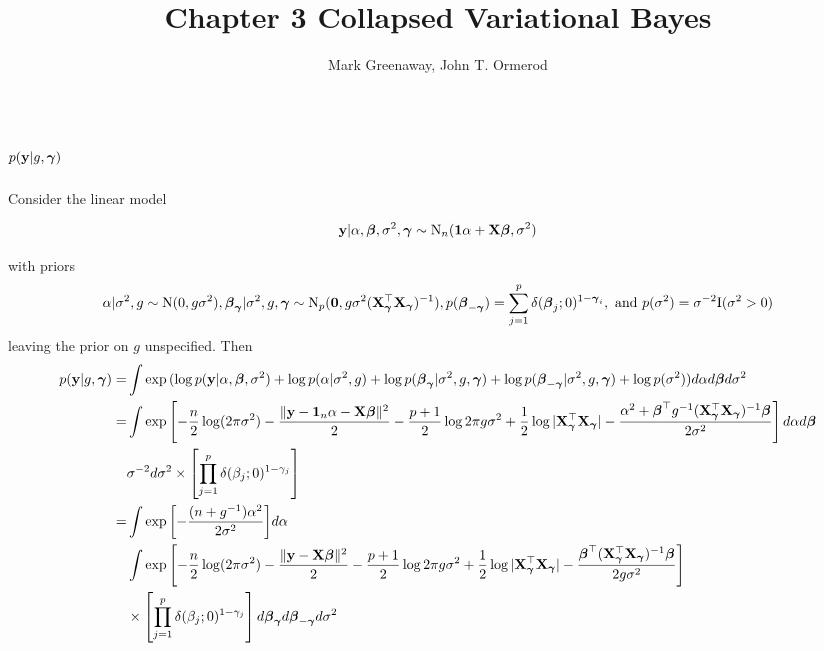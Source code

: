 \documentclass{amsart}[12pt]
\title{Chapter 3 Collapsed Variational Bayes}
\author{Mark Greenaway, John T. Ormerod}
\theoremstyle{definition}
\begin{document}
\section{$p({\bf y} | g, {\boldsymbol \gamma})$}
Consider the linear model

\[
	{\bf y} | \alpha, {\boldsymbol \beta}, \sigma^2, {\boldsymbol \gamma} \sim \text{N}_n({\bf 1} \alpha + {\bf X} {\boldsymbol \beta}, \sigma^2)
\]

\noindent with priors
\[
	\alpha | \sigma^2, g \sim \text{N}(0, g \sigma^2),
	{\boldsymbol \beta}_{\boldsymbol \gamma} | \sigma^2, g, {\boldsymbol \gamma} \sim \text{N}_p({\bf 0}, g \sigma^2 ({\bf X}_{\boldsymbol \gamma}^\top {\bf X}_{\boldsymbol \gamma})^{-1}),
	p({\boldsymbol \beta}_{-{\boldsymbol \gamma}}) = \sum_{j=1}^p \delta({\boldsymbol \beta}_j; 0)^{1 - {\boldsymbol \gamma}_i}, \text{ and }
	p(\sigma^2) = \sigma^{-2} \text{I}(\sigma^2 > 0)
\]
leaving the prior on $g$ unspecified. Then
\begin{align*}
	p({\bf y} | g, {\boldsymbol \gamma}) =& \int \exp{(\log p({\bf y}| \alpha, {\boldsymbol\beta}, \sigma^2) + \log p(\alpha | \sigma^2, g)
														+ \log p({\boldsymbol\beta}_{\boldsymbol\gamma}| \sigma^2, g, {\boldsymbol\gamma}) + \log p({\boldsymbol\beta}_{-{\boldsymbol\gamma}} | \sigma^2, g, {\boldsymbol\gamma}) + \log p(\sigma^2))} d \alpha d {\boldsymbol \beta} d \sigma^2 \\
		=& \int \exp{\left[-\frac{n}{2} \log (2 \pi \sigma^2) - \frac{\|{\bf y}- {\bf1}_n \alpha - {\bf X}{\boldsymbol\beta}\|^2}{2} 
		-\frac{p + 1}{2} \log{2\pi g \sigma^2} + \frac{1}{2} \log{|{\bf X}_{\boldsymbol\gamma}^\top {\bf X}_{\boldsymbol\gamma}|} - \frac{\alpha^2 + {\boldsymbol\beta}^\top g^{-1} ({\bf X}_{\boldsymbol\gamma}^\top {\bf X}_{\boldsymbol\gamma})^{-1} {\boldsymbol\beta}}{2 \sigma^{2}} \right] d \alpha d {\boldsymbol\beta}} \\
		&\sigma^{-2} d \sigma^2 \times \left[ \prod_{j=1}^p \delta(\beta_j; 0)^{1 - \gamma_j} \right] \\
		=& \int \exp{\left[ -\frac{(n + g^{-1}) \alpha^2}{2 \sigma^2} \right]} d \alpha \\
		&  \int \exp{\left[-\frac{n}{2} \log (2 \pi \sigma^2) - \frac{\|{\bf y}- {\bf X}{\boldsymbol\beta}\|^2}{2} 
		-\frac{p + 1}{2} \log{2\pi g \sigma^2} + \frac{1}{2} \log{|{\bf X}_{\boldsymbol\gamma}^\top {\bf X}_{\boldsymbol\gamma}|} - \frac{{\boldsymbol\beta}^\top ({\bf X}_{\boldsymbol\gamma}^\top {\bf X}_{\boldsymbol\gamma})^{-1} {\boldsymbol\beta}}{2 g \sigma^{2}} \right]}  \\
		&\times \left[ \prod_{j=1}^p \delta(\beta_j; 0)^{1 - \gamma_j} \right] d {\boldsymbol \beta}_{\boldsymbol \gamma} d {\boldsymbol \beta}_{-{\boldsymbol \gamma}} d \sigma^2
\end{align*}
\end{document}

